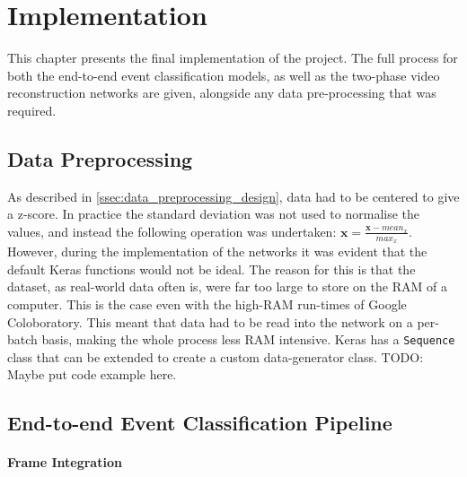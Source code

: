 \chapter{Implementation} \label{chap:implementation}

This chapter presents the final implementation of the project. The full process for both the end-to-end event classification models, as well as the two-phase video reconstruction networks are given, alongside any data pre-processing that was required.

\section{Data Preprocessing}

As described in  \cref{ssec:data_preprocessing_design}, data had to be centered to give a z-score. In practice the standard deviation was not used to normalise the values, and instead the following operation was undertaken: $ \textbf{x} = \frac{\textbf{x} - mean_x}{max_x} $. However, during the implementation of the networks it was evident that the default Keras functions would not be ideal. The reason for this is that the dataset, as real-world data often is, were far too large to store on the RAM of a computer. This is the case even with the high-RAM run-times of Google Coloboratory. This meant that data had to be read into the network on a per-batch basis, making the whole process less RAM intensive. Keras has a \lstinline{Sequence} class that can be extended to create a custom data-generator class. \color{red} TODO: Maybe put code example here. \color{black}

\section{End-to-end Event Classification Pipeline}

\subsubsection{Frame Integration}


